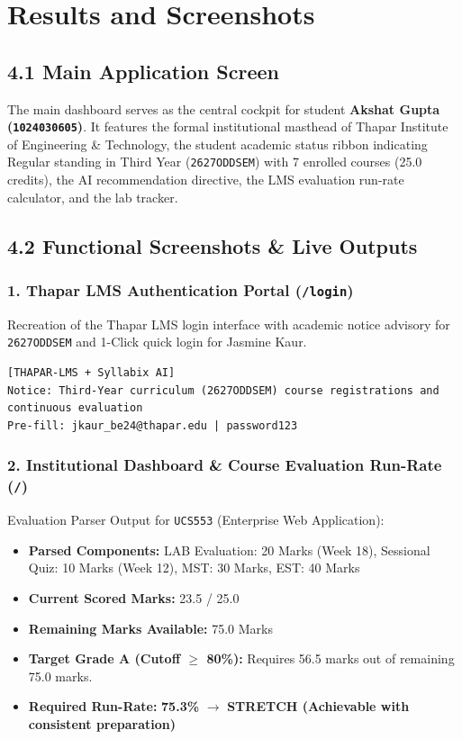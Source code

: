 \documentclass[12pt,a4paper]{report}
\begin{document}
\newpage
\chapter{\color{ThaparCrimson} Results and Screenshots}

\section{4.1 Main Application Screen}
The main dashboard serves as the central cockpit for student \textbf{Akshat Gupta (\texttt{1024030605})}. It features the formal institutional masthead of Thapar Institute of Engineering \& Technology, the student academic status ribbon indicating Regular standing in Third Year (\texttt{2627ODDSEM}) with 7 enrolled courses (25.0 credits), the AI recommendation directive, the LMS evaluation run-rate calculator, and the lab tracker.

\section{4.2 Functional Screenshots \& Live Outputs}

\subsection{1. Thapar LMS Authentication Portal (\texttt{/login})}
Recreation of the Thapar LMS login interface with academic notice advisory for \texttt{2627ODDSEM} and 1-Click quick login for Jasmine Kaur.
\begin{lstlisting}[language={},numbers=none]
[THAPAR-LMS + Syllabix AI]
Notice: Third-Year curriculum (2627ODDSEM) course registrations and continuous evaluation
Pre-fill: jkaur_be24@thapar.edu | password123
\end{lstlisting}

\subsection{2. Institutional Dashboard \& Course Evaluation Run-Rate (\texttt{/})}
Evaluation Parser Output for \texttt{UCS553} (Enterprise Web Application):
\begin{itemize}
    \item \textbf{Parsed Components:} LAB Evaluation: 20 Marks (Week 18), Sessional Quiz: 10 Marks (Week 12), MST: 30 Marks, EST: 40 Marks
    \item \textbf{Current Scored Marks:} 23.5 / 25.0
    \item \textbf{Remaining Marks Available:} 75.0 Marks
    \item \textbf{Target Grade A (Cutoff $\ge$ 80\%):} Requires 56.5 marks out of remaining 75.0 marks.
    \item \textbf{Required Run-Rate:} \textbf{75.3\%} $\rightarrow$ \textbf{STRETCH (Achievable with consistent preparation)}
\end{itemize}
\end{document}
